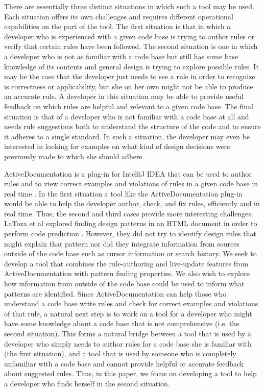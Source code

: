\documentclass[12pt]{article}
\begin{document}
There are essentially three distinct situations in which such a tool may be used. Each situation offers its own challenges and requires different operational capabilities on the part of the tool. The first situation is that in which a developer who is experienced with a given code base is trying to author rules or verify that certain rules have been followed. The second situation is one in which a developer who is not as familiar with a code base but still has some base knowledge of its contents and general design is trying to explore possible rules. It may be the case that the developer just needs to see a rule in order to recognize is correctness or applicability, but she on her own might not be able to produce an accurate rule. A developer in this situation may be able to provide useful feedback on which rules are helpful and relevant to a given code base. The final situation is that of a developer who is not familiar with a code base at all and needs rule suggestions both to understand the structure of the code and to ensure it adheres to a single standard. In such a situation, the developer may even be interested in looking for examples on what kind of design decisions were previously made to which she should adhere.

 ActiveDocumentation is a plug-in for IntelliJ IDEA that can be used to author rules and to view correct examples and violations of rules in a given code base in real time \cite{MehrpurEtAl2019}. In the first situation a tool like the ActiveDocumentation plug-in would be able to help the developer author, check, and fix rules, efficiently and in real time. Thus, the second and third cases provide more interesting challenges. LaToza et al explored finding design patterns in an HTML document in order to perform code prediction \cite{LaTozaEtAl2019}. However, they did not try to identify design rules that might explain that pattern nor did they integrate information from sources outside of the code base such as cursor information or search history. We seek to develop a tool that combines the rule-authoring and live-update features from ActiveDocumentation with pattern finding properties. We also wish to explore how information from outside of the code base could be used to inform what patterns are identified. Since ActiveDocumentation can help those who understand a code base write rules and check for correct examples and violations of that rule, a natural next step is to work on a tool for a developer who might have some knowledge about a code base that is not comprehensive (i.e. the second situation). This forms a natural bridge between a tool that is used by a developer who simply needs to author rules for a code base she is familiar with (the first situation), and a tool that is used by someone who is completely unfamiliar with a code base and cannot provide helpful or accurate feedback about suggested rules. Thus, in this paper, we focus on developing a tool to help a developer who finds herself in the second situation.
\clearpage
\end{document}
